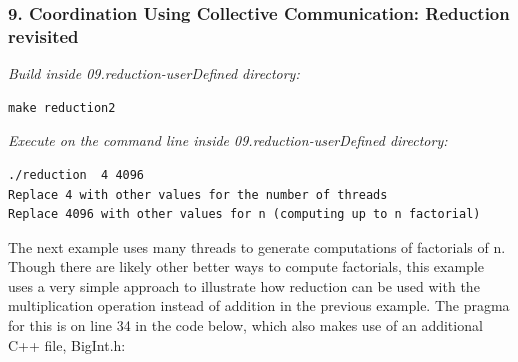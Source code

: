 \documentclass[letterpaper,10pt,openany,oneside]{sphinxmanual}
\begin{document}
\subsubsection{9. Coordination Using Collective Communication: Reduction revisited}
\label{SharedMemory/DataDecomp_Reduction:coordination-using-collective-communication-reduction-revisited}
\emph{Build inside 09.reduction-userDefined directory:}

\begin{Verbatim}[commandchars=\\\{\}]
make reduction2
\end{Verbatim}

\emph{Execute on the command line inside 09.reduction-userDefined directory:}

\begin{Verbatim}[commandchars=\\\{\}]
./reduction  4 4096
Replace 4 with other values for the number of threads
Replace 4096 with other values for n (computing up to n factorial)
\end{Verbatim}

The next example uses many threads to generate computations of factorials of n. Though there are likely other better ways to compute factorials, this
example uses a very simple approach to illustrate how reduction can be used with the
multiplication operation instead of addition in the previous example. The pragma for
this is on line 34 in the code below, which also makes use of an additional C++ file, BigInt.h:
\end{document}
